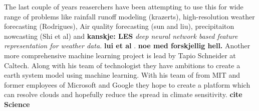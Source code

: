 The last couple of years reaserchers have been attempting to use this for wide range of problems like rainfall runoff modeling (krazerts), high-resolution weather forecasting (Rodrigues), Air quality forecasting (sun and liu), precipitaiton nowcasting (Shi et al) and \textbf{kanskje: LES} \textit{deep neural network based feature representation for weather data.} \textbf{lui et al }. \textbf{noe med forskjellig hell.} Another more comprehensive machine learning project is lead by Tapio Schneider at Caltech. Along with his team of technologist they have ambitions to create a earth system model using machine learning. With his team of from MIT and former employees of Microsoft and Google they hope to create a platform which can resolve clouds and hopefully reduce the spread in climate sensitivity. \textbf{cite Science}





